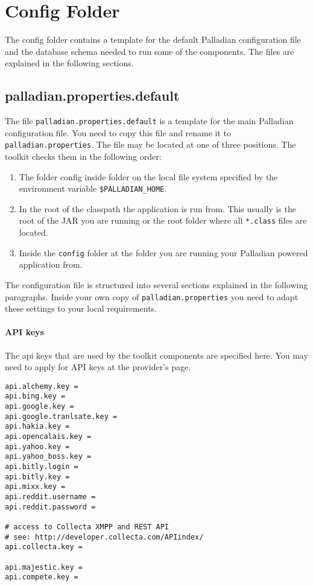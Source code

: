 \section{Config Folder}
\label{sec:config.conf}
The config folder contains a template for the default Palladian configuration file and the database schema needed to run some of the components. The files are explained in the following sections.

\subsection{palladian.properties.default}
\label{sec:palladian.properties.default}
The file \texttt{palladian.properties.default} is a template for the main Palladian configuration file. You need to copy this file and rename it to \texttt{palladian.properties}. The file may be located at one of three positions. The toolkit checks them in the following order:
\begin{enumerate}
\item The folder config inside folder on the local file system specified by the environment variable \texttt{\$PALLADIAN\_HOME}.
\item In the root of the classpath the application is run from. This usually is the root of the JAR you are running or the root folder where all \texttt{*.class} files are located.
\item Inside the \texttt{config} folder at the folder you are running your Palladian powered application from.
\end{enumerate}

The configuration file is structured into several sections explained in the following paragraphs. Inside your own copy of \texttt{palladian.properties} you need to adapt these settings to your local requirements.

\paragraph{API keys}
\label{sec:apikeys.conf}
The api keys that are used by the toolkit components are specified here. You may need to apply for API keys at the provider's page.

\begin{verbatim}
api.alchemy.key = 
api.bing.key = 
api.google.key = 
api.google.tranlsate.key = 
api.hakia.key =
api.opencalais.key =
api.yahoo.key = 
api.yahoo_boss.key = 
api.bitly.login = 
api.bitly.key = 
api.mixx.key = 
api.reddit.username = 
api.reddit.password = 

# access to Collecta XMPP and REST API
# see: http://developer.collecta.com/APIindex/
api.collecta.key = 

api.majestic.key = 
api.compete.key = 
\end{verbatim}

